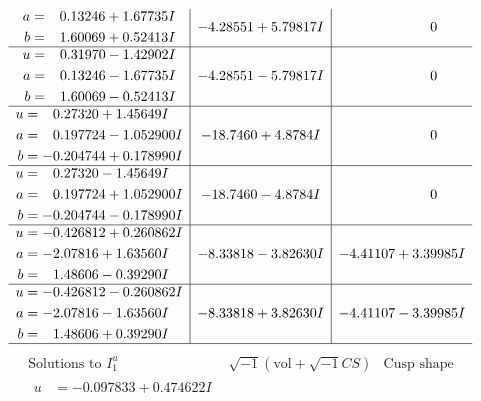 \documentclass[1p]{elsarticle_modified}
\theoremstyle{definition}
\newcommand{\I}{\sqrt{-1}}
\begin{document}
$$\begin{array}{c|c|c}
\begin{aligned}
a &= \phantom{-}0.13246 + 1.67735 I \\
b &= \phantom{-}1.60069 + 0.52413 I\end{aligned}
 & -4.28551 + 5.79817 I & \phantom{-0.000000 } 0 \\ \hline\begin{aligned}
u &= \phantom{-}0.31970 - 1.42902 I \\
a &= \phantom{-}0.13246 - 1.67735 I \\
b &= \phantom{-}1.60069 - 0.52413 I\end{aligned}
 & -4.28551 - 5.79817 I & \phantom{-0.000000 } 0 \\ \hline\begin{aligned}
u &= \phantom{-}0.27320 + 1.45649 I \\
a &= \phantom{-}0.197724 - 1.052900 I \\
b &= -0.204744 + 0.178990 I\end{aligned}
 & -18.7460 + 4.8784 I & \phantom{-0.000000 } 0 \\ \hline\begin{aligned}
u &= \phantom{-}0.27320 - 1.45649 I \\
a &= \phantom{-}0.197724 + 1.052900 I \\
b &= -0.204744 - 0.178990 I\end{aligned}
 & -18.7460 - 4.8784 I & \phantom{-0.000000 } 0 \\ \hline\begin{aligned}
u &= -0.426812 + 0.260862 I \\
a &= -2.07816 + 1.63560 I \\
b &= \phantom{-}1.48606 - 0.39290 I\end{aligned}
 & -8.33818 - 3.82630 I & -4.41107 + 3.39985 I \\ \hline\begin{aligned}
u &= -0.426812 - 0.260862 I \\
a &= -2.07816 - 1.63560 I \\
b &= \phantom{-}1.48606 + 0.39290 I\end{aligned}
 & -8.33818 + 3.82630 I & -4.41107 - 3.39985 I\\
 \hline 
 \end{array}$$\newpage$$\begin{array}{c|c|c}  
\text{Solutions to }I^u_{1}& \I (\text{vol} + \sqrt{-1}CS) & \text{Cusp shape}\\
 \hline 
\begin{aligned}
u &= -0.097833 + 0.474622 I \\

\end{aligned}
\end{array}$$
\end{document}
